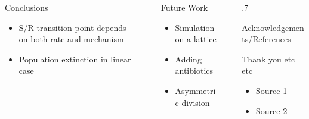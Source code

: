 \documentclass[final]{beamer}
\newlength{\sepwid}
\newlength{\onecolwid}
\begin{document}
\begin{frame}[t]
\begin{block}
\begin{columns}[t]
\begin{column}{\onecolwid}
  \begin{alertblock}{Conclusions}
    \begin{itemize}
      \item S/R transition point depends on both rate and mechanism
      \item Population extinction in linear case
    \end{itemize}
    \vspace{.005\baselineskip}
  \end{alertblock}
\end{column}

\begin{column}{\sepwid}\end{column} %

\begin{column}{\onecolwid}
  \begin{alertblock}{Future Work}
    \begin{itemize}
      \item Simulation on a lattice
      \item Adding antibiotics
      \item Asymmetric division
    \end{itemize}

    \vspace{.05ex}
  \end{alertblock}
\end{column}

\begin{column}{\sepwid}\end{column} %

\begin{column}{.7\onecolwid}
  \begin{alertblock}{Acknowledgements/References}

      Thank you etc etc

    \begin{itemize}
      \item Source 1
      \item Source 2
    \end{itemize}
  \end{alertblock}
\end{column}
\end{columns} %
\end{block}


\end{frame} %
\end{document}

